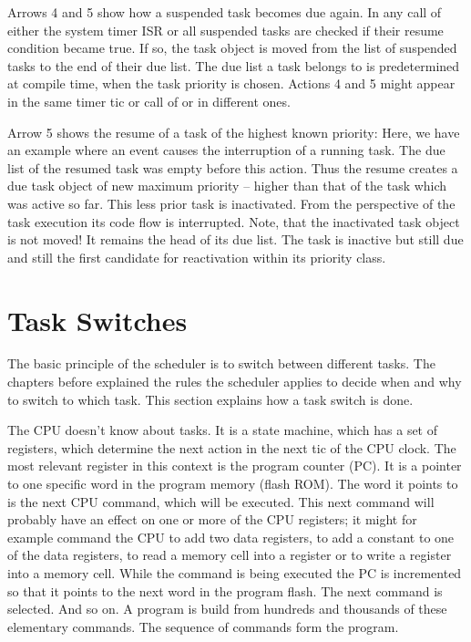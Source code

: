 Arrows 4 and 5 show how a suspended task becomes due again. In any call of
either the system timer ISR or  all suspended tasks are
checked if their resume condition became true. If so, the task object is
moved from the list of suspended tasks to the end of their due list. The
due list a task belongs to is predetermined at compile time, when the task
priority is chosen. Actions 4 and 5 might appear in the same timer tic or
call of  or in different ones.

Arrow 5 shows the resume of a task of the highest known priority: Here, we
have an example where an event causes the interruption of a running task.
The due list of the resumed task was empty before this action. Thus the
resume creates a due task object of new maximum priority -- higher than
that of the task which was active so far. This less prior task is
inactivated. From the perspective of the task execution its code flow is
interrupted. Note, that the inactivated task object is not moved! It
remains the head of its due list. The task is inactive but still due and
still the first candidate for reactivation within its priority class.


\section{Task Switches}

The basic principle of the scheduler is to switch between different tasks.
The chapters before explained the rules the scheduler applies to decide
when and why to switch to which task. This section explains how a task
switch is done.

The CPU doesn't know about tasks. It is a state machine, which has a set
of registers, which determine the next action in the next tic of the CPU
clock. The most relevant register in this context is the program counter
(PC). It is a pointer to one specific word in the program memory (flash
ROM). The word it points to is the next CPU command, which will be
executed. This next command will probably have an effect on one or more of
the CPU registers; it might for example command the CPU to add two data
registers, to add a constant to one of the data registers, to read a
memory cell into a register or to write a register into a memory cell.
While the command is being executed the PC is incremented so that it
points to the next word in the program flash. The next command is
selected. And so on. A program is build from hundreds and thousands of
these elementary commands. The sequence of commands form the program.

